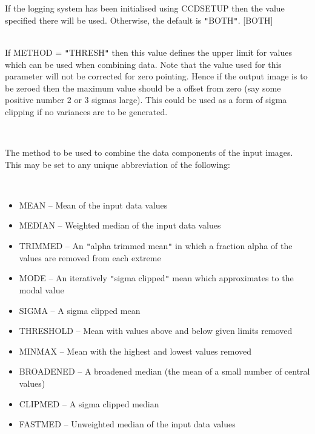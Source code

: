 \documentclass[twoside,11pt]{article}
\newcommand{\htmlref}[2]{#1}
\renewcommand{\_}{\texttt{\symbol{95}}}
\newcommand{\qt}[1]{{\tt "}#1{\tt "}}
\newcommand{\xroutine}[1]{\htmlref{{\sc #1}}{#1}}
\newcommand{\sstsubsection}[1]{ \item[{#1}] \mbox{} \\}
\newcommand{\sstitemlist}[1]{
  \mbox{} \\
  \vspace{-3.5ex}
  \begin{itemize}
     #1
  \end{itemize}
}
\newcommand{\sstitem}{\item}
\newcommand{\sstsubsection}[1]{\item[{#1}]}
\newcommand{\sstitemlist}[1]{
      \begin{itemize}
         #1
      \end{itemize}
      \\
   }
\newcommand{\sstitem}{\item}
\begin{document}
{{{{         }
         If the logging system has been initialised using \xroutine{CCDSETUP}
         then the value specified there will be used. Otherwise, the
         default is \qt{BOTH}.
         [BOTH]
      }
      \sstsubsection{
         MAX = \_REAL (Read)
      } {
         If METHOD = \qt{THRESH} then this value defines the upper limit
         for values which can be used when combining data. Note that the
         value used for this parameter will not be corrected for zero
         pointing. Hence if the output image is to be zeroed then the
         maximum value should be a offset from zero (say some positive
         number 2 or 3 sigmas large). This could be used as a form of
         sigma clipping if no variances are to be generated.
      }
      \sstsubsection{
         METHOD = LITERAL (Read)
      } {
         The method to be used to combine the data components of
         the input images. This may be set to any unique abbreviation of
         the following:
         \sstitemlist{

            \sstitem
               MEAN      -- Mean of the input data values

            \sstitem
               MEDIAN    -- Weighted median of the input data values

            \sstitem
               TRIMMED   -- An \qt{alpha trimmed mean} in which a fraction
                               alpha of the values are removed from
                               each extreme

            \sstitem
               MODE      -- An iteratively \qt{sigma clipped} mean which
                               approximates to the modal value

            \sstitem
               SIGMA     -- A sigma clipped mean

            \sstitem
               THRESHOLD -- Mean with values above and below given
                               limits removed

            \sstitem
               MINMAX    -- Mean with the highest and lowest values
                               removed

            \sstitem
               BROADENED -- A broadened median (the mean of a small
                               number of central values)
            \sstitem
               CLIPMED   -- A sigma clipped median

            \sstitem
               FASTMED   -- Unweighted median of the input data values

}}}}
\end{document}
